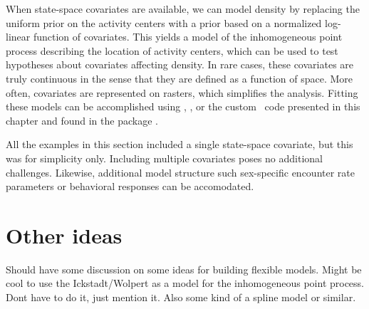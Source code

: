 When state-space covariates are available, we can model
density by replacing the uniform prior on the activity centers with a
prior based on a normalized log-linear function of covariates. This
yields a model of the inhomogeneous point process describing the
location of activity centers, which can be used to test hypotheses
about covariates affecting density. In
rare cases, these covariates are truly continuous in the sense that
they are defined as a function of space. More often, covariates are
represented on rasters, which simplifies the analysis. Fitting these
models can be accomplished using \bugs, \secr, or the custom \R~code
presented in this chapter and found in the package \scrbook.

All the examples in this section included a single state-space
covariate, but this was for simplicity only. Including multiple
covariates poses no additional challenges. Likewise, additional model
structure such sex-specific encounter rate parameters or behavioral
responses can be accomodated.









\section{Other ideas}

Should have some discussion on some ideas for building flexible
models. Might be cool to use the Ickstadt/Wolpert as a model for the
inhomogeneous point process. Dont have to do it, just mention it. Also
some kind of a spline model or similar.
